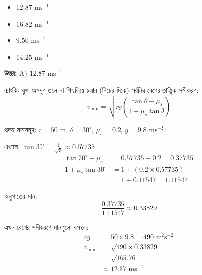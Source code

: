 \documentclass[12pt, a4paper]{article}
\begin{document}
\begin{itemize}[label={}, leftmargin=1cm, itemsep=0.5em]
    \item[\textbf{A)}] $12.87\text{ ms}^{-1}$
    \item[\textbf{B)}] $16.82\text{ ms}^{-1}$
    \item[\textbf{C)}] $9.50\text{ ms}^{-1}$
    \item[\textbf{D)}] $14.25\text{ ms}^{-1}$
\end{itemize}

\vspace{0.5em}
\begin{tcolorbox}[answerbox]
    \textbf{\color{success} উত্তর:} A) $12.87\text{ ms}^{-1}$
\end{tcolorbox}
\vspace{1em}

\begin{tcolorbox}[solutionbox={সমাধান (Solution)}]
    \noindent
    ব্যাংকিং যুক্ত অমসৃণ তলে না পিছলিয়ে চলার (নিচের দিকে) সর্বনিম্ন বেগের তাত্ত্বিক সমীকরণ:
    \[ v_{\min} = \sqrt{r g \left(\frac{\tan\theta - \mu_s}{1 + \mu_s \tan\theta}\right)} \]
    
    প্রদত্ত মানসমূহ: $r = 50\text{ m}$, $\theta = 30^\circ$, $\mu_s = 0.2$, $g = 9.8\text{ ms}^{-2}$।
    
    এখানে, $\tan 30^\circ = \frac{1}{\sqrt{3}} \approx 0.57735$
    \begin{align*}
        \tan 30^\circ - \mu_s &= 0.57735 - 0.2 = 0.37735 \\
        1 + \mu_s \tan 30^\circ &= 1 + (0.2 \times 0.57735) \\
                                &= 1 + 0.11547 = 1.11547
    \end{align*}
    
    অনুপাতের মান:
    \[ \frac{0.37735}{1.11547} \approx 0.33829 \]
    
    এখন বেগের সমীকরণে মানগুলো বসালে:
    \begin{align*}
        r g &= 50 \times 9.8 = 490\text{ m}^2\text{s}^{-2} \\
        v_{\min} &= \sqrt{490 \times 0.33829} \\
                 &= \sqrt{165.76} \\
                 &\approx \mathbf{12.87}\text{ ms}^{-1}
    \end{align*}
\end{tcolorbox}
\end{document}
